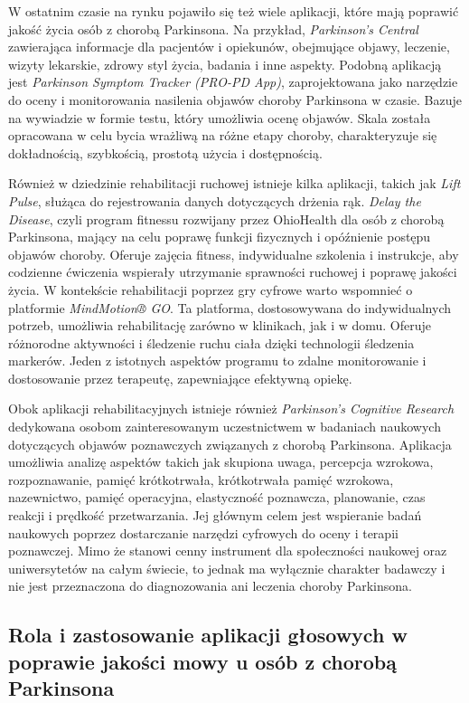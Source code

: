 W ostatnim czasie na rynku pojawiło się też wiele aplikacji, które mają poprawić jakość życia osób z chorobą Parkinsona.
Na przykład, \emph{Parkinson's Central} zawierająca informacje dla pacjentów i opiekunów, obejmujące objawy, leczenie, wizyty lekarskie, zdrowy styl życia, badania i inne aspekty.
Podobną aplikacją jest \emph{Parkinson Symptom Tracker (PRO-PD App)}, zaprojektowana jako narzędzie do oceny i monitorowania nasilenia objawów choroby Parkinsona w czasie.
Bazuje na wywiadzie w formie testu, który umożliwia ocenę objawów.
Skala została opracowana w celu bycia wrażliwą na różne etapy choroby, charakteryzuje się dokładnością, szybkością, prostotą użycia i dostępnością.

Również w dziedzinie rehabilitacji ruchowej istnieje kilka aplikacji, takich jak \emph{Lift Pulse}, służąca do rejestrowania danych dotyczących drżenia rąk.
\emph{Delay the Disease}, czyli  program fitnessu rozwijany przez OhioHealth dla osób z chorobą Parkinsona, mający na celu poprawę funkcji fizycznych i opóźnienie postępu objawów choroby.
Oferuje zajęcia fitness, indywidualne szkolenia i instrukcje, aby codzienne ćwiczenia wspierały utrzymanie sprawności ruchowej i poprawę jakości życia.
W kontekście rehabilitacji poprzez gry cyfrowe warto wspomnieć o platformie \emph{MindMotion® GO}.
Ta platforma, dostosowywana do indywidualnych potrzeb, umożliwia rehabilitację zarówno w klinikach, jak i w domu.
Oferuje różnorodne aktywności i śledzenie ruchu ciała dzięki technologii śledzenia markerów.
Jeden z istotnych aspektów programu to zdalne monitorowanie i dostosowanie przez terapeutę, zapewniające efektywną opiekę.

Obok aplikacji rehabilitacyjnych istnieje również \emph{Parkinson's Cognitive Research} dedykowana osobom zainteresowanym uczestnictwem w badaniach
naukowych dotyczących objawów poznawczych związanych z chorobą Parkinsona.
Aplikacja umożliwia analizę aspektów takich jak skupiona uwaga, percepcja wzrokowa, rozpoznawanie, pamięć krótkotrwała,
krótkotrwała pamięć wzrokowa, nazewnictwo, pamięć operacyjna, elastyczność poznawcza, planowanie, czas reakcji i prędkość przetwarzania.
Jej głównym celem jest wspieranie badań naukowych poprzez dostarczanie narzędzi cyfrowych do oceny i terapii poznawczej.
Mimo że stanowi cenny instrument dla społeczności naukowej oraz uniwersytetów na całym świecie, to jednak ma wyłącznie charakter badawczy i nie jest przeznaczona do diagnozowania ani leczenia choroby Parkinsona.

\subsection{Rola i zastosowanie aplikacji głosowych w poprawie jakości mowy u osób z chorobą Parkinsona}
\label{subsec:aplikacje-glosowe}

